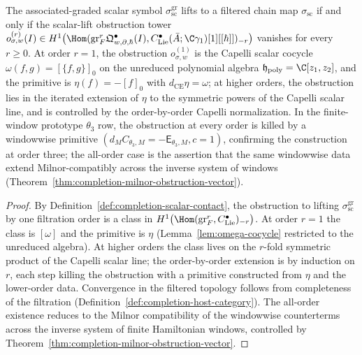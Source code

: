 \begin{thm}
\label{thm:completion-sigma-sc}
The associated-graded scalar symbol
\(\sigma_{\mathrm{sc}}^{\mathrm{gr}}\) lifts to a filtered chain
map \(\sigma_{\mathrm{sc}}\) if and only if the scalar-lift
obstruction tower
\(o^{(r)}_{\sigma,w}(I)\in H^1\bigl(
\Hom(\mathrm{gr}^r_F\mathfrak Q^\bullet_{w,\partial,\hbar}(I),
C^\bullet_{\mathrm{Lie}}(\bar A;\C\gamma_1)[1][[\hbar]])_{-r}\bigr)\)
vanishes for every \(r\ge 0\).  At order \(r=1\), the obstruction
\(o^{(1)}_{\sigma,w}\) is the Capelli scalar cocycle
\(\omega(f,g)=[\{f,g\}]_0\) on the unreduced polynomial algebra
\(\mathfrak h_{\mathrm{poly}}=\C[z_1,z_2]\), and the primitive is
\(\eta(f)=-[f]_0\) with \(d_{\mathrm{CE}}\eta=\omega\); at higher
orders, the obstruction lies in the iterated extension of \(\eta\)
to the symmetric powers of the Capelli scalar line, and is
controlled by the order-by-order Capelli normalization.  In the
finite-window prototype \(\theta_3\) row, the obstruction at every
order is killed by a windowwise primitive
\((d_M C_{\theta_3,M}=-\mathsf E_{\theta_3,M},c=1)\), confirming
the construction at order three; the all-order case is the
assertion that the same windowwise data extend Milnor-compatibly
across the inverse system of windows
(Theorem~\ref{thm:completion-milnor-obstruction-vector}).
\end{thm}

\begin{proof}
By Definition~\ref{def:completion-scalar-contact}, the obstruction
to lifting \(\sigma_{\mathrm{sc}}^{\mathrm{gr}}\) by one
filtration order is a class in
\(H^1\bigl(\Hom(\mathrm{gr}^r_F,C^\bullet_{\mathrm{Lie}})_{-r}\bigr)\).
At order \(r=1\) the class is \([\omega]\) and the primitive is
\(\eta\) (Lemma~\ref{lem:omega-cocycle} restricted to the
unreduced algebra).  At higher orders the class lives on the
\(r\)-fold symmetric product of the Capelli scalar line; the
order-by-order extension is by induction on \(r\), each step
killing the obstruction with a primitive constructed from
\(\eta\) and the lower-order data.  Convergence in the filtered
topology follows from completeness of the filtration
(Definition~\ref{def:completion-host-category}).  The all-order
existence reduces to the Milnor compatibility of the windowwise
counterterms across the inverse system of finite Hamiltonian
windows, controlled by
Theorem~\ref{thm:completion-milnor-obstruction-vector}.
\end{proof}

